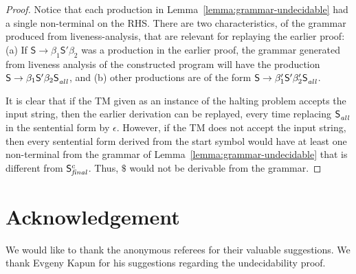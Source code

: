 \documentclass[9pt,nonatbib]{sigplanconf}
\begin{document}
\begin{proof}
Notice that  each production  in Lemma~\ref{lemma:grammar-undecidable}
had a single non-terminal on the RHS. There are two characteristics, of
the grammar produced from liveness-analysis,  that are relevant for
replaying the  earlier proof:  (a) If $\mathsf{S}  \rightarrow \beta_1
\mathsf{S'}  \beta_2$  was a  production  in  the earlier  proof,  the
grammar  generated from  liveness  analysis of the constructed program
will  have the  production
$\mathsf{S}      \rightarrow      \beta_1     \mathsf{S'}      \beta_2
\mathsf{S}_{\mathit{\mathit{all}}}^{}$,  and (b)  other  productions are  of the  form
$\mathsf{S}       \rightarrow       \beta_1'\mathsf{S'}       \beta_2'
\mathsf{S}_{\mathit{all}}^{}$.

It is clear that if the TM given as an instance of the halting problem
accepts the input string, then the earlier derivation can be replayed,
every   time   replacing   $\mathsf{S}_{\mathit{\mathit{all}}}^{}$   in   the
sentential form by $\epsilon$. However, if  the TM does not accept the
input string, then every sentential form derived from the start symbol
would    have     at    least    one    non-terminal from the grammar
of Lemma~\ref{lemma:grammar-undecidable} that is different
from $\mathsf{S}_{\mathit{final}}^{c}$.   Thus,  $\$$  would  not  be
derivable from the grammar.
\end{proof}


\section*{Acknowledgement}
We would like to thank the anonymous referees for their valuable suggestions. We thank 
Evgeny Kapun for his suggestions regarding the undecidability proof.

\balance
{}

\end{document}
